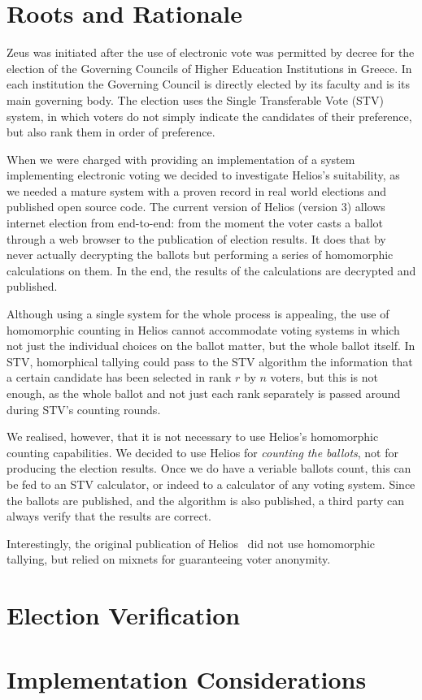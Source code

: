 \documentclass[runningheads,a4paper]{llncs}
\begin{document}
\section{Roots and Rationale}

Zeus was initiated after the use of electronic vote was permitted by
decree for the election of the Governing Councils of Higher Education
Institutions in Greece. In each institution the Governing Council is
directly elected by its faculty and is its main governing body. The
election uses the Single Transferable Vote (STV) system, in which
voters do not simply indicate the candidates of their preference, but
also rank them in order of preference. 

When we were charged with providing an implementation of a system
implementing electronic voting we decided to investigate Helios's
suitability, as we needed a mature system with a proven record in real
world elections and published open source code. The current version of
Helios (version 3) allows internet election from end-to-end: from the
moment the voter casts a ballot through a web browser to the
publication of election results. It does that by never actually
decrypting the ballots but performing a series of homomorphic
calculations on them. In the end, the results of the calculations are
decrypted and published. 

Although using a single system for the whole process is appealing, the
use of homomorphic counting in Helios cannot accommodate voting
systems in which not just the individual choices on the ballot matter,
but the whole ballot itself. In STV, homorphical tallying could pass
to the STV algorithm the information that a certain candidate has been
selected in rank $r$ by $n$ voters, but this is not enough, as the whole
ballot and not just each rank separately is passed around during STV's
counting rounds.

We realised, however, that it is not necessary to use Helios's
homomorphic counting capabilities. We decided to use Helios for
\emph{counting the ballots}, not for producing the election results.
Once we do have a veriable ballots count, this can be fed to an STV
calculator, or indeed to a calculator of any voting system. Since the
ballots are published, and the algorithm is also published, a third
party can always verify that the results are correct.

Interestingly, the original publication of Helios~\cite{adida:2008}
did not use homomorphic tallying, but relied on mixnets for
guaranteeing voter anonymity. 

\section{Election Verification}

\section{Implementation Considerations}



\end{document}
